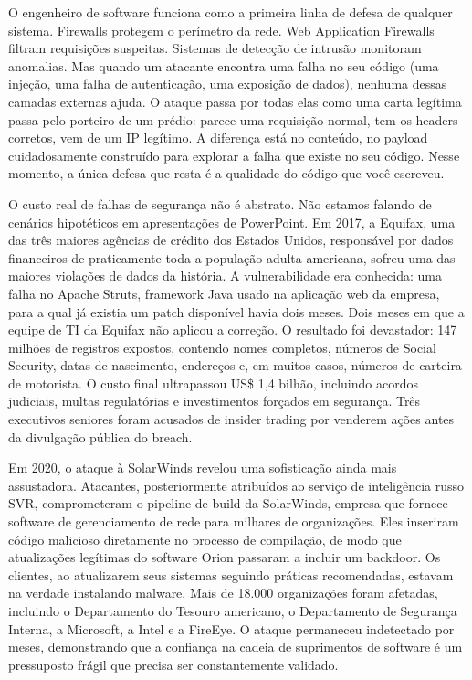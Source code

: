 O engenheiro de software funciona como a primeira linha de defesa de qualquer
sistema. Firewalls protegem o perímetro da rede. Web Application Firewalls
filtram requisições suspeitas. Sistemas de detecção de intrusão monitoram
anomalias. Mas quando um atacante encontra uma falha no seu código (uma
injeção, uma falha de autenticação, uma exposição de dados), nenhuma dessas
camadas externas ajuda. O ataque passa por todas elas como uma carta legítima
passa pelo porteiro de um prédio: parece uma requisição normal, tem os headers
corretos, vem de um IP legítimo. A diferença está no conteúdo, no payload
cuidadosamente construído para explorar a falha que existe no seu código. Nesse
momento, a única defesa que resta é a qualidade do código que você escreveu.

O custo real de falhas de segurança não é abstrato. Não estamos falando de
cenários hipotéticos em apresentações de PowerPoint. Em 2017, a Equifax, uma
das três maiores agências de crédito dos Estados Unidos, responsável por dados
financeiros de praticamente toda a população adulta americana, sofreu uma das
maiores violações de dados da história. A vulnerabilidade era conhecida: uma
falha no Apache Struts, framework Java usado na aplicação web da empresa, para a
qual já existia um patch disponível havia dois meses. Dois meses em que a equipe
de TI da Equifax não aplicou a correção. O resultado foi devastador: 147 milhões
de registros expostos, contendo nomes completos, números de Social Security,
datas de nascimento, endereços e, em muitos casos, números de carteira de
motorista. O custo final ultrapassou US\$ 1,4 bilhão, incluindo acordos
judiciais, multas regulatórias e investimentos forçados em segurança. Três
executivos seniores foram acusados de insider trading por venderem ações antes
da divulgação pública do breach.

Em 2020, o ataque à SolarWinds revelou uma sofisticação ainda mais assustadora.
Atacantes, posteriormente atribuídos ao serviço de inteligência russo SVR,
comprometeram o pipeline de build da SolarWinds, empresa que fornece software de
gerenciamento de rede para milhares de organizações. Eles inseriram código
malicioso diretamente no processo de compilação, de modo que atualizações
legítimas do software Orion passaram a incluir um backdoor. Os clientes, ao
atualizarem seus sistemas seguindo práticas recomendadas, estavam na verdade
instalando malware. Mais de 18.000 organizações foram afetadas, incluindo o
Departamento do Tesouro americano, o Departamento de Segurança Interna, a
Microsoft, a Intel e a FireEye. O ataque permaneceu indetectado por meses,
demonstrando que a confiança na cadeia de suprimentos de software é um
pressuposto frágil que precisa ser constantemente validado.


